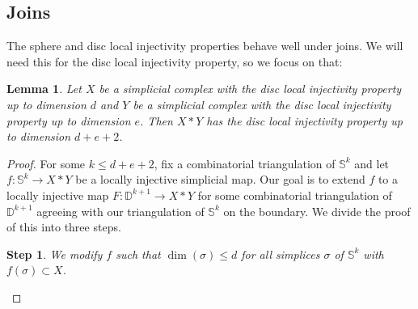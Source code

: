 \documentclass[11pt]{amsart}
\numberwithin{equation}{section}
\theoremstyle{plain}
\newtheorem{lemma}[theorem]{Lemma}
\newtheorem{stepsa}{Step}
\theoremstyle{definition}
\theoremstyle{remark}
\newcommand\bbD{\ensuremath{\mathbb{D}}}
\newcommand\bbS{\ensuremath{\mathbb{S}}}
\begin{document}
\subsection{Joins}
The sphere and disc local injectivity properties behave well under joins.  We will need this for the
disc local injectivity property, so we focus on that:

\begin{lemma}
\label{lemma:discjoin}
Let $X$ be a simplicial complex with the disc local injectivity property up to dimension $d$ and $Y$
be a simplicial complex with the disc local injectivity property up to dimension $e$.  Then $X \ast Y$
has the disc local injectivity property up to dimension $d+e+2$.
\end{lemma}
\begin{proof}
For some $k \leq d+e+2$, fix a combinatorial triangulation of $\bbS^k$ and let $f\colon \bbS^k \rightarrow X \ast Y$
be a locally injective simplicial map.  Our goal is to extend $f$ to a locally injective map
$F\colon \bbD^{k+1} \rightarrow X \ast Y$ for some combinatorial triangulation of $\bbD^{k+1}$ agreeing
with our triangulation of $\bbS^k$ on the boundary.  We divide the proof of this into three steps.

\begin{stepsa}
We modify $f$ such that $\dim(\sigma) \leq d$ for all simplices $\sigma$ of $\bbS^k$ with $f(\sigma) \subset X$.
\end{stepsa}


\end{proof}
\end{document}
